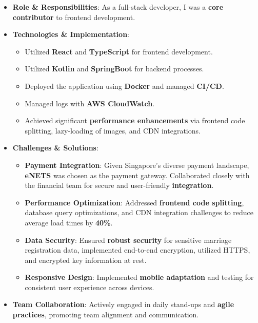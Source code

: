 \documentclass{resume}
\begin{document}
  \begin{itemize}
    \item \textbf{Role \& Responsibilities}: As a full-stack developer, I was a \textbf{core contributor} to frontend development.
    
    \item \textbf{Technologies \& Implementation}:
      \begin{itemize}
        \item Utilized \textbf{React} and \textbf{TypeScript} for frontend development.
        \item Utilized \textbf{Kotlin} and \textbf{SpringBoot} for backend processes.
        \item Deployed the application using \textbf{Docker} and managed \textbf{CI/CD}.
        \item Managed logs with \textbf{AWS CloudWatch}.
        \item Achieved significant \textbf{performance enhancements} via frontend code splitting, lazy-loading of images, and CDN integrations.
      \end{itemize}
    
    \item \textbf{Challenges \& Solutions}:
      \begin{itemize}
        \item \textbf{Payment Integration}: Given Singapore's diverse payment landscape, \textbf{eNETS} was chosen as the payment gateway. Collaborated closely with the financial team for secure and user-friendly \textbf{integration}.
        \item \textbf{Performance Optimization}: Addressed \textbf{frontend code splitting}, database query optimizations, and CDN integration challenges to reduce average load times by \textbf{40\%}.
        \item \textbf{Data Security}: Ensured \textbf{robust security} for sensitive marriage registration data, implemented end-to-end encryption, utilized HTTPS, and encrypted key information at rest.
        \item \textbf{Responsive Design}: Implemented \textbf{mobile adaptation} and testing for consistent user experience across devices.
      \end{itemize}

    \item \textbf{Team Collaboration}: Actively engaged in daily stand-ups and \textbf{agile practices}, promoting team alignment and communication.
  \end{itemize}
  
\end{document}
